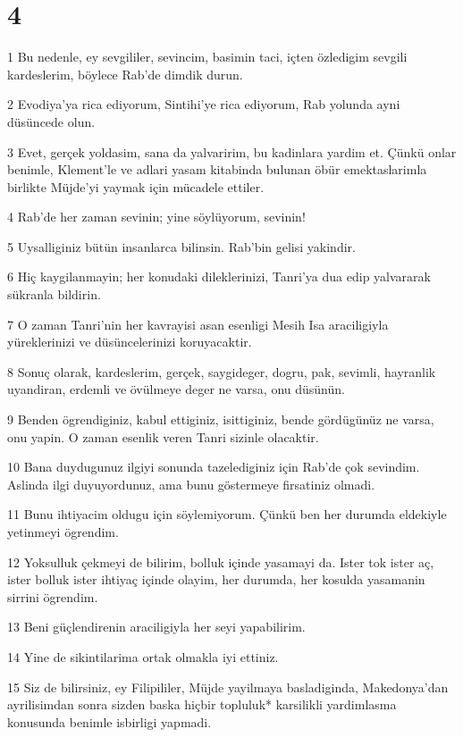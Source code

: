 \chapter{4}

\par 1 Bu nedenle, ey sevgililer, sevincim, basimin taci, içten özledigim sevgili kardeslerim, böylece Rab'de dimdik durun.
\par 2 Evodiya'ya rica ediyorum, Sintihi'ye rica ediyorum, Rab yolunda ayni düsüncede olun.
\par 3 Evet, gerçek yoldasim, sana da yalvaririm, bu kadinlara yardim et. Çünkü onlar benimle, Klement'le ve adlari yasam kitabinda bulunan öbür emektaslarimla birlikte Müjde'yi yaymak için mücadele ettiler.
\par 4 Rab'de her zaman sevinin; yine söylüyorum, sevinin!
\par 5 Uysalliginiz bütün insanlarca bilinsin. Rab'bin gelisi yakindir.
\par 6 Hiç kaygilanmayin; her konudaki dileklerinizi, Tanri'ya dua edip yalvararak sükranla bildirin.
\par 7 O zaman Tanri'nin her kavrayisi asan esenligi Mesih Isa araciligiyla yüreklerinizi ve düsüncelerinizi koruyacaktir.
\par 8 Sonuç olarak, kardeslerim, gerçek, saygideger, dogru, pak, sevimli, hayranlik uyandiran, erdemli ve övülmeye deger ne varsa, onu düsünün.
\par 9 Benden ögrendiginiz, kabul ettiginiz, isittiginiz, bende gördügünüz ne varsa, onu yapin. O zaman esenlik veren Tanri sizinle olacaktir.
\par 10 Bana duydugunuz ilgiyi sonunda tazelediginiz için Rab'de çok sevindim. Aslinda ilgi duyuyordunuz, ama bunu göstermeye firsatiniz olmadi.
\par 11 Bunu ihtiyacim oldugu için söylemiyorum. Çünkü ben her durumda eldekiyle yetinmeyi ögrendim.
\par 12 Yoksulluk çekmeyi de bilirim, bolluk içinde yasamayi da. Ister tok ister aç, ister bolluk ister ihtiyaç içinde olayim, her durumda, her kosulda yasamanin sirrini ögrendim.
\par 13 Beni güçlendirenin araciligiyla her seyi yapabilirim.
\par 14 Yine de sikintilarima ortak olmakla iyi ettiniz.
\par 15 Siz de bilirsiniz, ey Filipililer, Müjde yayilmaya basladiginda, Makedonya'dan ayrilisimdan sonra sizden baska hiçbir topluluk* karsilikli yardimlasma konusunda benimle isbirligi yapmadi.
